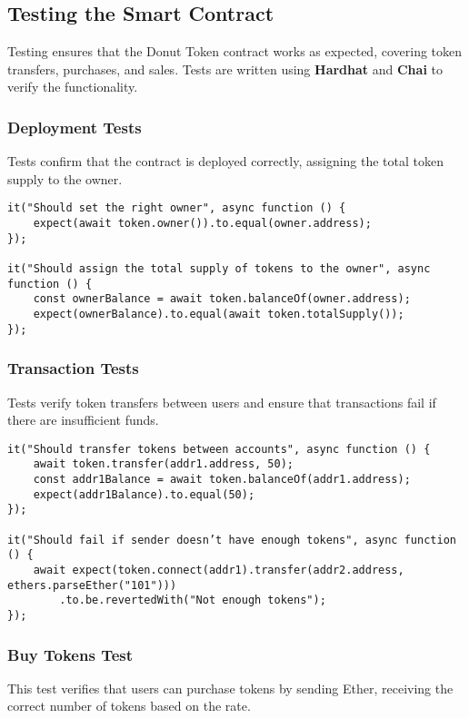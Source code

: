 \documentclass[../main.tex]{subfiles}
\begin{document}

\subsection{Testing the Smart Contract}
Testing ensures that the Donut Token contract works as expected, covering token transfers, purchases, and sales. Tests are written using \textbf{Hardhat} and \textbf{Chai} to verify the functionality.

\subsubsection{Deployment Tests}
Tests confirm that the contract is deployed correctly, assigning the total token supply to the owner.

\begin{verbatim}
it("Should set the right owner", async function () {
    expect(await token.owner()).to.equal(owner.address);
});

it("Should assign the total supply of tokens to the owner", async function () {
    const ownerBalance = await token.balanceOf(owner.address);
    expect(ownerBalance).to.equal(await token.totalSupply());
});
\end{verbatim}

\subsubsection{Transaction Tests}
Tests verify token transfers between users and ensure that transactions fail if there are insufficient funds.

\begin{verbatim}
it("Should transfer tokens between accounts", async function () {
    await token.transfer(addr1.address, 50);
    const addr1Balance = await token.balanceOf(addr1.address);
    expect(addr1Balance).to.equal(50);
});

it("Should fail if sender doesn’t have enough tokens", async function () {
    await expect(token.connect(addr1).transfer(addr2.address, ethers.parseEther("101")))
        .to.be.revertedWith("Not enough tokens");
});
\end{verbatim}

\subsubsection{Buy Tokens Test}
This test verifies that users can purchase tokens by sending Ether, receiving the correct number of tokens based on the rate.
\end{document}

